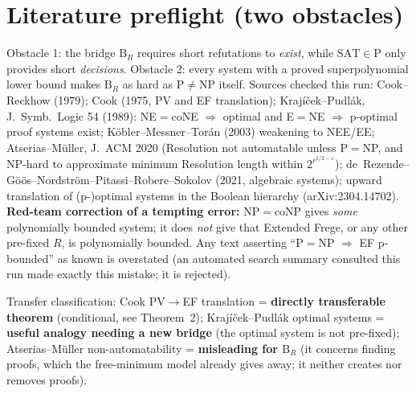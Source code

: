 \documentclass[11pt]{article}
\begin{document}
\section{Literature preflight (two obstacles)}
Obstacle 1: the bridge $\mathrm B_R$ requires short refutations to \emph{exist}, while
$\mathrm{SAT}\in\mathrm P$ only provides short \emph{decisions}.  Obstacle 2: every system with a
proved superpolynomial lower bound makes $\mathrm B_R$ as hard as P$\neq$NP itself.
Sources checked this run: Cook--Reckhow (1979); Cook (1975, PV and EF translation);
Krajíček--Pudlák, J.\ Symb.\ Logic 54 (1989): NE$=$coNE $\Rightarrow$ optimal and E$=$NE
$\Rightarrow$ p-optimal proof systems exist; Köbler--Messner--Torán (2003) weakening to
NEE/EE; Atserias--Müller, J.\ ACM 2020 (Resolution not automatable unless P$=$NP, and
NP-hard to approximate minimum Resolution length within $2^{r^{1/2-\varepsilon}}$);
de~Rezende--Göös--Nordström--Pitassi--Robere--Sokolov (2021, algebraic systems);
upward translation of (p-)optimal systems in the Boolean hierarchy (arXiv:2304.14702).
\textbf{Red-team correction of a tempting error:} NP$=$coNP gives \emph{some}
polynomially bounded system; it does \emph{not} give that Extended Frege, or any other
pre-fixed $R$, is polynomially bounded.  Any text asserting ``P$=$NP $\Rightarrow$ EF
p-bounded'' as known is overstated (an automated search summary consulted this run made
exactly this mistake; it is rejected).

Transfer classification: Cook PV$\to$EF translation = \textbf{directly transferable theorem}
(conditional, see Theorem~2); Krajíček--Pudlák optimal systems = \textbf{useful analogy needing a
new bridge} (the optimal system is not pre-fixed); Atserias--Müller non-automatability =
\textbf{misleading for $\mathrm B_R$} (it concerns finding proofs, which the free-minimum model
already gives away; it neither creates nor removes proofs).
\end{document}

